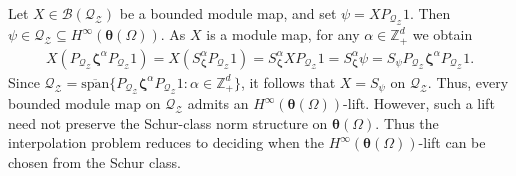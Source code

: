 \documentclass[12pt,reqno]{amsart}
\theoremstyle{remark}
\theoremstyle{definition}
\newcommand{\beqn}{\begin{eqnarray*}}
\newcommand{\eeqn}{\end{eqnarray*}}
\begin{document}
Let $X\in \mathcal{B}(\mathcal{Q}_{\mathcal{Z}})$ be a bounded module map,
and set $\psi =XP_{\mathcal{Q}_{\mathcal{Z}}} 1$. Then $ \psi \in \mathcal{Q}_{\mathcal{Z}}\subseteq H^\infty (\boldsymbol \theta(\Omega)).$
As $X$ is a module map, for any $\alpha \in \mathbb Z_+^d$ we obtain
\beqn X(P_{\mathcal{Q}_{\mathcal{Z}}} \boldsymbol \zeta^\alpha P_{\mathcal{Q}_{\mathcal{Z}}} 1) =X (S_{\boldsymbol \zeta}^\alpha  P_{\mathcal{Q}_{\mathcal{Z}}} 1)= S_{\boldsymbol \zeta}^\alpha X P_{\mathcal{Q}_{\mathcal{Z}}} 1= S_{\boldsymbol \zeta}^\alpha \psi=S_{\psi} P_{\mathcal{Q}_{\mathcal{Z}}} {\boldsymbol \zeta}^\alpha P_{\mathcal{Q}_{\mathcal{Z}}}1.\eeqn
Since $\mathcal{Q}_{\mathcal{Z}} =\overline{\mathrm{span}} \{P_{\mathcal{Q}_{\mathcal{Z}}} \boldsymbol \zeta^\alpha P_{\mathcal{Q}_{\mathcal{Z}}} 1: \alpha \in \mathbb Z_+^d \}$, it follows that $X=S_{\psi}$ on $\mathcal{Q}_{\mathcal{Z}}.$ 
Thus, every bounded module map on $\mathcal{Q}_{\mathcal{Z}}$ admits an $H^\infty(\boldsymbol \theta(\Omega))$-lift.
However, such a lift need not preserve the Schur-class norm structure on $\boldsymbol \theta(\Omega).$ 
Thus the interpolation problem reduces to deciding when the $H^\infty(\boldsymbol \theta(\Omega))$-lift can be chosen from the Schur class.
\end{document}
